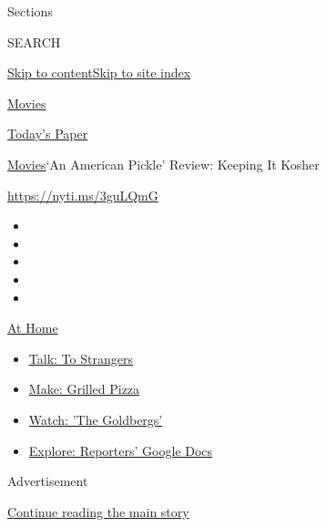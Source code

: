 Sections

SEARCH

\protect\hyperlink{site-content}{Skip to
content}\protect\hyperlink{site-index}{Skip to site index}

\href{https://www.nytimes.com/section/movies}{Movies}

\href{https://myaccount.nytimes.com/auth/login?response_type=cookie\&client_id=vi}{}

\href{https://www.nytimes.com/section/todayspaper}{Today's Paper}

\href{/section/movies}{Movies}\textbar{}`An American Pickle' Review:
Keeping It Kosher

\url{https://nyti.ms/3guLQmG}

\begin{itemize}
\item
\item
\item
\item
\item
\end{itemize}

\href{https://www.nytimes.com/spotlight/at-home?action=click\&pgtype=Article\&state=default\&region=TOP_BANNER\&context=at_home_menu}{At
Home}

\begin{itemize}
\tightlist
\item
  \href{https://www.nytimes.com/2020/08/03/well/family/the-benefits-of-talking-to-strangers.html?action=click\&pgtype=Article\&state=default\&region=TOP_BANNER\&context=at_home_menu}{Talk:
  To Strangers}
\item
  \href{https://www.nytimes.com/2020/08/01/at-home/coronavirus-make-pizza-on-a-grill.html?action=click\&pgtype=Article\&state=default\&region=TOP_BANNER\&context=at_home_menu}{Make:
  Grilled Pizza}
\item
  \href{https://www.nytimes.com/2020/07/31/arts/television/goldbergs-abc-stream.html?action=click\&pgtype=Article\&state=default\&region=TOP_BANNER\&context=at_home_menu}{Watch:
  'The Goldbergs'}
\item
  \href{https://www.nytimes.com/interactive/2020/at-home/even-more-reporters-editors-diaries-lists-recommendations.html?action=click\&pgtype=Article\&state=default\&region=TOP_BANNER\&context=at_home_menu}{Explore:
  Reporters' Google Docs}
\end{itemize}

Advertisement

\protect\hyperlink{after-top}{Continue reading the main story}


